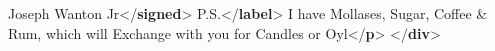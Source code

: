 \begin{shaded}
\hspace*{1em}Joseph Wanton Jr{</\textbf{signed}>}\mbox{}\newline 
{}\mbox{}\newline 
{}\mbox{}\newline 
\hspace*{1em}P.S.{</\textbf{label}>}\mbox{}\newline 
\hspace*{1em}I have Mollases, Sugar,\mbox{}\newline 
\hspace*{1em}Coffee \& Rum, which\mbox{}\newline 
\hspace*{1em}will Exchange with you\mbox{}\newline 
\hspace*{1em}for Candles or Oyl{</\textbf{p}>}\mbox{}\newline 
{}\mbox{}\newline 
{</\textbf{div}>}\end{shaded}\egroup\par \noindent  
